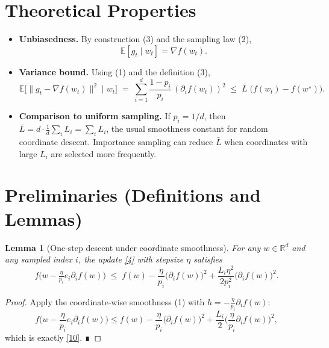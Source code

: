 \documentclass{article}
\newtheorem{lemma}{Lemma}
\newcommand{\E}{\mathbb{E}}
\newcommand{\R}{\mathbb{R}}
\newcommand{\grad}{\nabla}
\begin{document}
\section*{Theoretical Properties}
\begin{itemize}
\item \textbf{Unbiasedness.} By construction (3) and the sampling law (2),
\[
\E[g_t\mid w_t]=\grad f(w_t).
\tag{8}
\]
\item \textbf{Variance bound.} Using (1) and the definition (3),
\[
\E\!\big[\|g_t-\grad f(w_t)\|^2\mid w_t\big]
\;=\;
\sum_{i=1}^{d}\frac{1-p_i}{p_i}\,(\partial_i f(w_t))^{2}
\;\le\;
\bar L\;\big(f(w_t)-f(w^\star)\big).
\tag{9}
\]
\item \textbf{Comparison to uniform sampling.} If $p_i=1/d$, then $\bar L=d\cdot\frac{1}{d}\sum_i L_i =\sum_i L_i$, the usual smoothness constant for random coordinate descent. Importance sampling can reduce $\bar L$ when coordinates with large $L_i$ are selected more frequently.
\end{itemize}

\section*{Preliminaries (Definitions and Lemmas)}
\begin{lemma}[One‑step descent under coordinate smoothness]\label{lem:one-step}
For any $w\in\R^{d}$ and any sampled index $i$, the update \eqref{4} with stepsize $\eta$ satisfies
\[
f\big(w-\tfrac{\eta}{p_i}e_i\partial_i f(w)\big)
\;\le\;
f(w)-\frac{\eta}{p_i}\big(\partial_i f(w)\big)^{2}
+\frac{L_i\eta^{2}}{2p_i^{2}}\big(\partial_i f(w)\big)^{2}.
\tag{10}
\]
\end{lemma}
\begin{proof}
Apply the coordinate‑wise smoothness (1) with $h=-\tfrac{\eta}{p_i}\partial_i f(w)$:
\[
f\!\Big(w-\frac{\eta}{p_i}e_i\partial_i f(w)\Big)
\le f(w)-\frac{\eta}{p_i}\big(\partial_i f(w)\big)^{2}
+\frac{L_i}{2}\Big(\frac{\eta}{p_i}\partial_i f(w)\Big)^{2},
\]
which is exactly \eqref{10}. ∎
\end{proof}
\end{document}
